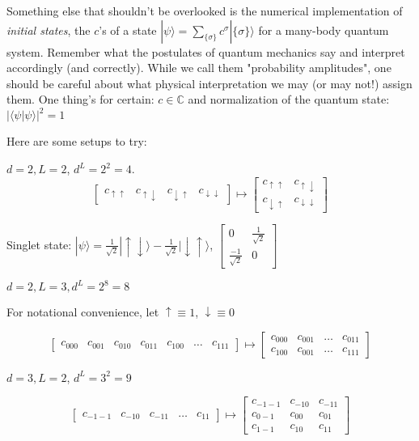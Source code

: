 \documentclass[10pt]{amsart}
\begin{document}
\begin{multicols*}{2}
Something else that shouldn't be overlooked is the numerical implementation of \emph{initial states}, the $c$'s of a state $| \psi \rangle = \sum_{ \lbrace \sigma \rbrace } c^{\sigma} | \lbrace \sigma \rbrace \rangle$ for a many-body quantum system. Remember what the postulates of quantum mechanics say and interpret accordingly (and correctly). While we call them "probability amplitudes", one should be careful about what physical interpretation we may (or may not!) assign them. One thing's for certain: $c \in \mathbb{C}$ and normalization of the quantum state: $ | \langle \psi | \psi \rangle |^2 = 1$

Here are some setups to try:

$d= 2, L=2$, $d^L = 2^2=4$.
\[
\left[ \begin{matrix} c_{\uparrow \uparrow} & c_{\uparrow \downarrow} & c_{\downarrow \uparrow} & c_{\downarrow \downarrow} \end{matrix} \right] \mapsto \left[ \begin{matrix} c_{\uparrow \uparrow} & c_{\uparrow \downarrow} \\
c_{\downarrow \uparrow} & c_{\downarrow \downarrow} \end{matrix} \right]
\]

Singlet state: $|\psi \rangle = \frac{1}{ \sqrt{2}} | \uparrow \downarrow \rangle -  \frac{1}{\sqrt{2}} | \downarrow \uparrow \rangle $, $\left[ \begin{matrix} 0 & \frac{1}{\sqrt{2}} \\ \frac{-1}{\sqrt{2}} & 0 \end{matrix} \right]$ 

$d=2, L=3, d^L = 2^8 = 8$

For notational convenience, let $\uparrow \equiv 1$, $\downarrow \equiv 0$

\[
\left[ \begin{matrix} c_{000} & c_{001} & c_{010} & c_{011} & c_{100} & \dots & c_{111}  \end{matrix} \right] \mapsto \left[ \begin{matrix} c_{000} & c_{001} & \dots & c_{011} \\
c_{100} & c_{001} & \dots & c_{111} \end{matrix} \right]
\]

$d=3, L=2$, $d^L = 3^2 = 9$

\[
\left[ \begin{matrix} c_{-1-1} & c_{-10 } & c_{-11} & \dots  & c_{11} \end{matrix} \right] \mapsto \left[ \begin{matrix} c_{-1-1} & c_{-10} &  c_{-11} \\
c_{0-1} & c_{00} &  c_{01} \\ 
c_{1-1} & c_{10} & c_{11} \end{matrix} \right]
\]



\end{multicols*}
\end{document}
